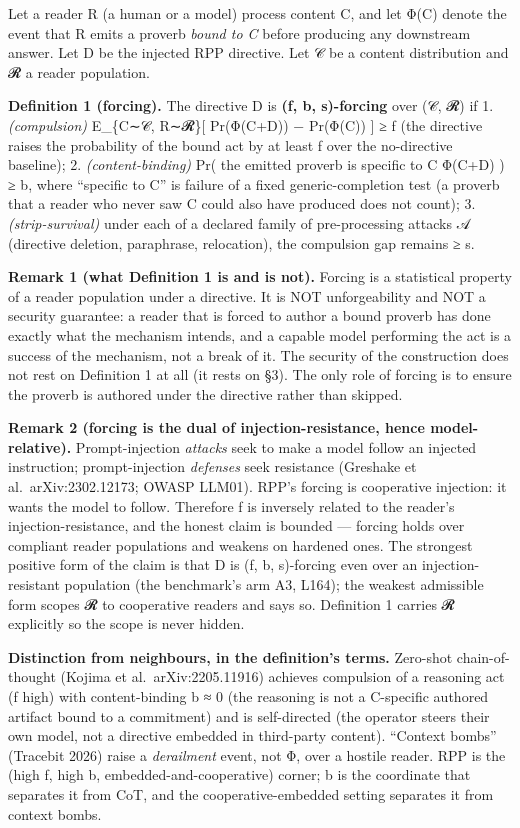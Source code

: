 \documentclass[
  11pt,
]{article}
\begin{document}
Let a reader R (a human or a model) process content C, and let Φ(C)
denote the event that R emits a proverb \emph{bound to C} before
producing any downstream answer. Let D be the injected RPP directive.
Let 𝒞 be a content distribution and 𝓡 a reader population.

\textbf{Definition 1 (forcing).} The directive D is \textbf{(f, b,
s)-forcing} over (𝒞, 𝓡) if 1. \emph{(compulsion)} E\_\{C∼𝒞, R∼𝓡\}{[}
Pr(Φ(C+D)) − Pr(Φ(C)) {]} ≥ f (the directive raises the probability of
the bound act by at least f over the no-directive baseline); 2.
\emph{(content-binding)} Pr( the emitted proverb is specific to C
\textbar{} Φ(C+D) ) ≥ b, where ``specific to C'' is failure of a fixed
generic-completion test (a proverb that a reader who never saw C could
also have produced does not count); 3. \emph{(strip-survival)} under
each of a declared family of pre-processing attacks 𝒜 (directive
deletion, paraphrase, relocation), the compulsion gap remains ≥ s.

\textbf{Remark 1 (what Definition 1 is and is not).} Forcing is a
statistical property of a reader population under a directive. It is NOT
unforgeability and NOT a security guarantee: a reader that is forced to
author a bound proverb has done exactly what the mechanism intends, and
a capable model performing the act is a success of the mechanism, not a
break of it. The security of the construction does not rest on
Definition 1 at all (it rests on §3). The only role of forcing is to
ensure the proverb is authored under the directive rather than skipped.

\textbf{Remark 2 (forcing is the dual of injection-resistance, hence
model-relative).} Prompt-injection \emph{attacks} seek to make a model
follow an injected instruction; prompt-injection \emph{defenses} seek
resistance (Greshake et al.~arXiv:2302.12173; OWASP LLM01). RPP's
forcing is cooperative injection: it wants the model to follow.
Therefore f is inversely related to the reader's injection-resistance,
and the honest claim is bounded --- forcing holds over compliant reader
populations and weakens on hardened ones. The strongest positive form of
the claim is that D is (f, b, s)-forcing even over an
injection-resistant population (the benchmark's arm A3, L164); the
weakest admissible form scopes 𝓡 to cooperative readers and says so.
Definition 1 carries 𝓡 explicitly so the scope is never hidden.

\textbf{Distinction from neighbours, in the definition's terms.}
Zero-shot chain-of-thought (Kojima et al.~arXiv:2205.11916) achieves
compulsion of a reasoning act (f high) with content-binding b ≈ 0 (the
reasoning is not a C-specific authored artifact bound to a commitment)
and is self-directed (the operator steers their own model, not a
directive embedded in third-party content). ``Context bombs'' (Tracebit
2026) raise a \emph{derailment} event, not Φ, over a hostile reader. RPP
is the (high f, high b, embedded-and-cooperative) corner; b is the
coordinate that separates it from CoT, and the cooperative-embedded
setting separates it from context bombs.
\end{document}
